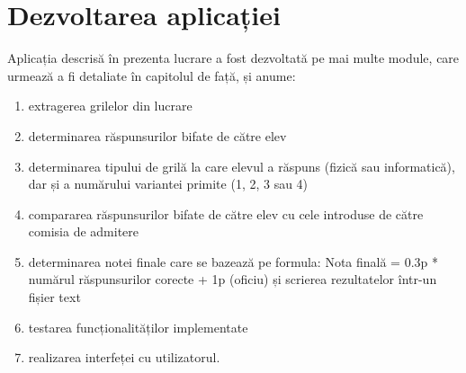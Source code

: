 \documentclass[a4paper,12pt]{report}
\newcommand\tab[1][1cm]{\hspace*{#1}}
\begin{document}
\chapter{Dezvoltarea aplicației}
\tab Aplicația descrisă în prezenta lucrare a fost dezvoltată pe mai multe module, care urmează a fi detaliate în capitolul de față, și anume:
\begin{enumerate}
\setlength\itemsep{1pt}
\item extragerea grilelor din lucrare
\item determinarea răspunsurilor bifate de către elev 
\item determinarea tipului de grilă la care elevul a răspuns (fizică sau informatică), dar și a numărului variantei primite (1, 2, 3 sau 4)
\item compararea răspunsurilor bifate de către elev cu cele introduse de către comisia de admitere
\item determinarea notei finale care se bazează pe formula: Nota finală = 0.3p *  numărul răspunsurilor corecte + 1p (oficiu) și scrierea rezultatelor într-un fișier text
\item testarea funcționalităților implementate
\item realizarea interfeței cu utilizatorul.
\end{enumerate}
\end{document}

